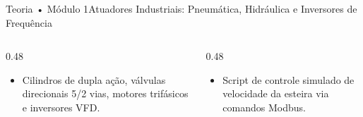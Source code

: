 \begin{senaiframe}{Teoria • Módulo 1}{Atuadores Industriais: Pneumática, Hidráulica e Inversores de Frequência}
  \begin{columns}[t]
    \begin{column}{0.48\textwidth}
      \begin{tcolorbox}[senaibluecard, title={Fundamentos Teóricos}]
        \begin{itemize}
          \item Cilindros de dupla ação, válvulas direcionais 5/2 vias, motores trifásicos e inversores VFD.
        \end{itemize}
      \end{tcolorbox}
    \end{column}
    \begin{column}{0.48\textwidth}
      \begin{tcolorbox}[senaigreencard, title={Prática \& Laboratório}]
        \begin{itemize}
          \item Script de controle simulado de velocidade da esteira via comandos Modbus.
        \end{itemize}
      \end{tcolorbox}
    \end{column}
  \end{columns}
\end{senaiframe}
